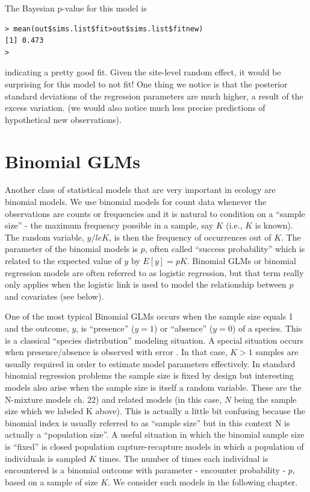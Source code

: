 The Bayesian p-value for this model is
\begin{verbatim}
> mean(out$sims.list$fit>out$sims.list$fitnew)
[1] 0.473
>
\end{verbatim}
indicating a pretty good fit. Given the site-level random effect, it
would be surprising for this model to not fit! One thing we notice is
that the posterior standard deviations of the regression parameters
are much higher, a result of the excess variation. (we would also
notice much less precise predictions of hypothetical new
observations).


\section{Binomial GLMs}

Another class of statistical models that are very important in ecology are binomial models. We use binomial models for count data whenever the observations are counts or frequencies and it is natural to condition on a ``sample size'' - the maximum frequency possible in a sample, say $K$ (i.e., $K$ is known). The random variable, $y/le K$, is then the frequency of occurrences out of $K$. The parameter of the binomial models is $p$, often called ``success probability'' which is related to the expected value of $y$ by $E[y] = pK$. Binomial GLMs or binomial regression models are often referred to as logistic regression, but that term really only applies when the logistic link is used to model the relationship between $p$ and covariates (see below).

One of the most typical Binomial GLMs occurs when the sample size
equals 1 and the outcome, $y$, is ``presence'' ($y=1$) or ``absence''
($y=0$) of a species. This is a classical ``species distribution''
modeling situation. A special situation occurs when presence/absence
is observed with error \citep{mackenzie_etal:2002,
  mackenzie_etal:2006, kery_etal:2010}. In that case, $K>1$ samples
are usually required in order to estimate model parameters
effectively. In standard binomial regression problems the sample size
is fixed by design but interesting models also arise when the sample
size is itself a random variable. These are the N-mixture models
\citep{royle:2004, kery_etal:2005, royle_dorazio:2008, kery:2010}
ch. 22) and related models (in this case, $N$ being the sample size
which we labeled K above). This is actually a little bit confusing
because the binomial index is usually referred to as ``sample size''
but in this context N is actually a ``population size''.  A useful
situation in which the binomial sample size is ``fixed'' is closed
population capture-recapture models in which a population of
individuals is sampled $K$ times.  The number of times each individual
is encountered is a binomial outcome with parameter - encounter
probability - $p$, based on a sample of size $K$.  We consider such
models in the following chapter.


